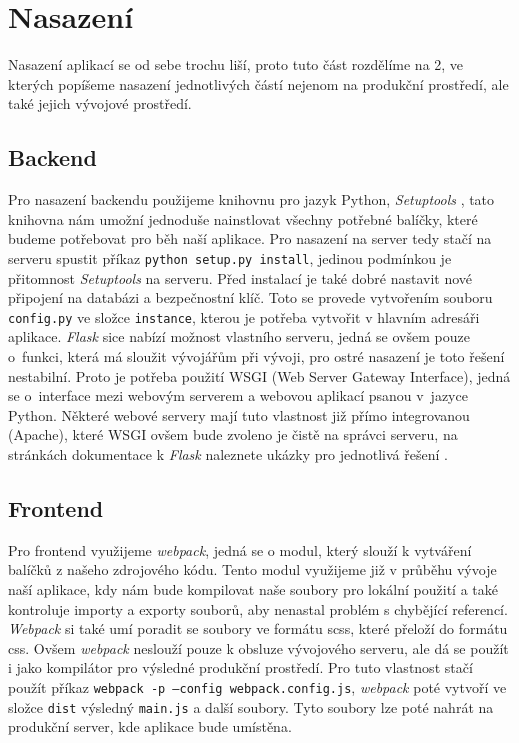 \section{Nasazení}

Nasazení aplikací se od sebe trochu liší, proto tuto část rozdělíme na 2, ve kterých popíšeme nasazení jednotlivých částí nejenom na produkční
prostředí, ale také jejich vývojové prostředí.

\subsection{Backend}

Pro nasazení backendu použijeme knihovnu pro jazyk Python, \textit{Setuptools} \cite{setupTools}, tato knihovna nám umožní
jednoduše nainstlovat všechny potřebné balíčky, které budeme potřebovat pro běh naší aplikace. Pro nasazení na server
tedy stačí na serveru spustit příkaz \texttt{python setup.py install}, jedinou podmínkou je přitomnost \textit{Setuptools}
na serveru. Před instalací je také dobré nastavit nové připojení na databázi a bezpečnostní klíč. Toto se provede vytvořením
souboru \texttt{config.py} ve složce \texttt{instance}, kterou je potřeba vytvořit v hlavním adresáři aplikace. \textit{Flask} sice nabízí možnost vlastního serveru, jedná se ovšem
pouze o~funkci, která má sloužit vývojářům při vývoji, pro ostré nasazení je toto řešení nestabilní. Proto je potřeba použití WSGI (Web Server Gateway Interface), jedná se o~interface
mezi webovým serverem a webovou aplikací psanou v~jazyce Python. Některé webové servery mají tuto vlastnost již přímo integrovanou (Apache), které WSGI ovšem bude zvoleno
je čistě na správci serveru, na stránkách dokumentace k \textit{Flask} naleznete ukázky pro jednotlivá řešení \cite{flaskDeploy}.


\subsection{Frontend}

Pro frontend využijeme \textit{webpack}, jedná se o modul, který slouží k vytváření balíčků z našeho zdrojového kódu. Tento modul
využijeme již v průběhu vývoje naší aplikace, kdy nám bude kompilovat naše soubory pro lokální použití a také kontroluje importy a exporty
souborů, aby nenastal problém s chybějící referencí. \textit{Webpack} si také umí poradit se soubory ve formátu \gls{scss}, které přeloží
do formátu \gls{css}. Ovšem \textit{webpack} neslouží pouze k obsluze vývojového serveru, ale dá se použít i jako kompilátor pro výsledné
produkční prostředí. Pro tuto vlastnost stačí použít příkaz \texttt{webpack -p --config webpack.config.js}, \textit{webpack} poté vytvoří
ve složce \texttt{dist} výsledný \texttt{main.js} a další soubory. Tyto soubory lze poté nahrát na produkční server, kde aplikace bude
umístěna.

